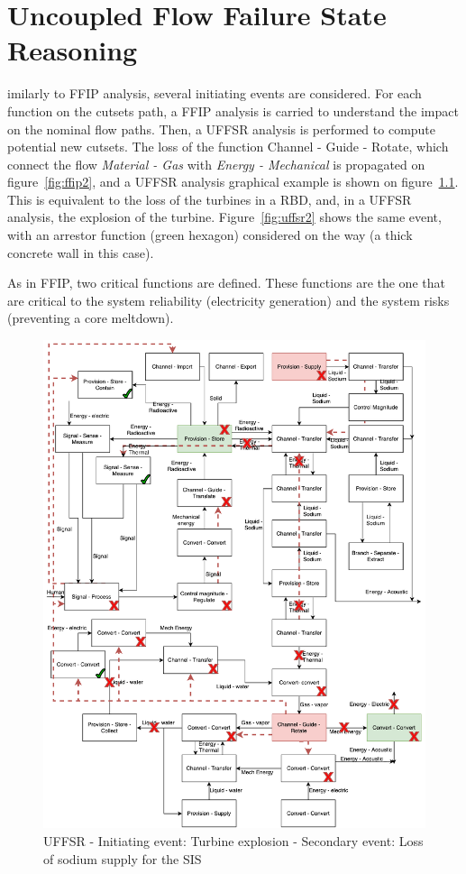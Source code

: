 %
%

\chapter{Uncoupled Flow Failure State Reasoning}
\label{app:app05}

imilarly to FFIP analysis, several initiating events are considered. For each function on the cutsets path, a FFIP analysis is carried to understand the impact on the nominal flow paths. Then, a UFFSR analysis is performed to compute potential new cutsets. The loss of the function {Channel - Guide - Rotate}, which connect the flow \textit{Material - Gas} with \textit{Energy - Mechanical} is propagated on figure~\ref{fig:ffip2}, and a UFFSR analysis graphical example is shown on figure~\ref{fig:uffsr1}. This is equivalent to the loss of the turbines in a RBD, and, in a UFFSR analysis, the explosion of the turbine. Figure~\ref{fig:uffsr2} shows the same event, with an arrestor function (green hexagon) considered on the way (a thick concrete wall in this case).

As in FFIP, two critical functions are defined. These functions are the one that are critical to the system reliability (electricity generation) and the system risks (preventing a core meltdown).

\begin{figure}[t]
\centering
\includegraphics[scale=.55]{fig0e/UFFSR_1}
\caption{UFFSR - Initiating event: Turbine explosion - Secondary event: Loss of sodium supply for the SIS}
\label{fig:uffsr1}
\end{figure}


